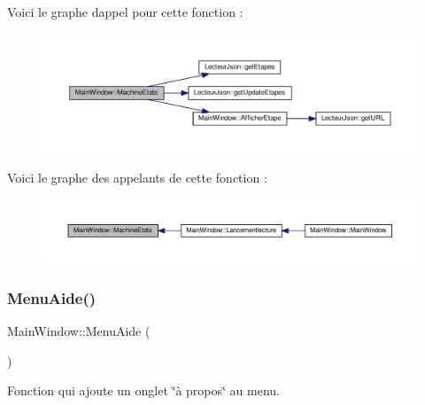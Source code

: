 Voici le graphe d\textquotesingle{}appel pour cette fonction \+:
\nopagebreak
\begin{figure}[H]
\begin{center}
\leavevmode
\includegraphics[width=350pt]{class_main_window_a59cd9a83e43405ae1ad5c18e79b04db5_cgraph}
\end{center}
\end{figure}
Voici le graphe des appelants de cette fonction \+:
\nopagebreak
\begin{figure}[H]
\begin{center}
\leavevmode
\includegraphics[width=350pt]{class_main_window_a59cd9a83e43405ae1ad5c18e79b04db5_icgraph}
\end{center}
\end{figure}
\mbox{\label{class_main_window_aca604490b4fa5077638a5245bee9e706}} 
\subsubsection{\texorpdfstring{Menu\+Aide()}{MenuAide()}}
{\footnotesize\ttfamily Main\+Window\+::\+Menu\+Aide (\begin{DoxyParamCaption}{ }\end{DoxyParamCaption})\hspace{0.3cm}{\ttfamily [private]}}



Fonction qui ajoute un onglet \char`\"{}à propos\char`\"{} au menu. 

